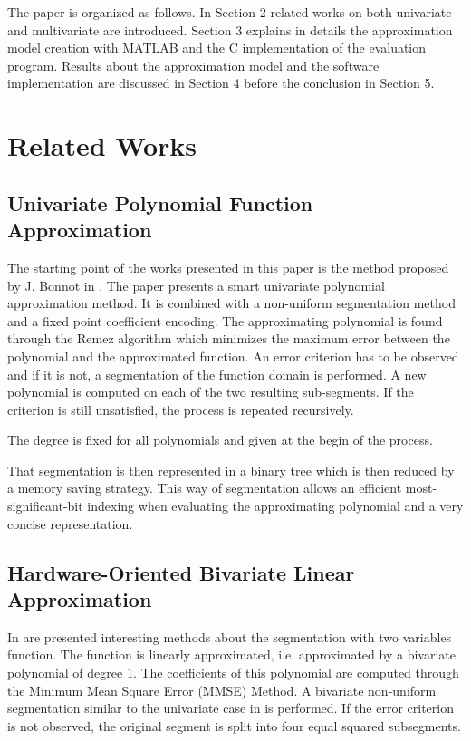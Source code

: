 \documentclass[fleqn,10pt]{SelfArx} %
\begin{document}
The paper is organized as follows. In Section 2 related works on both univariate and multivariate are introduced. Section 3 explains in details the approximation model creation with MATLAB and the C implementation of the evaluation program. Results about the approximation model and the software implementation are discussed in Section 4 before the conclusion in Section 5.

\section{Related Works}
\subsection{Univariate Polynomial Function Approximation}
The starting point of the works presented in this paper is the method proposed by J. Bonnot in \cite{juju}. The paper presents a smart univariate polynomial approximation method. It is combined with a non-uniform segmentation method and a fixed point coefficient encoding.
The approximating polynomial is found through the Remez algorithm which minimizes the maximum error between the polynomial and the approximated function.
An error criterion has to be observed and if it is not, a segmentation of the function domain is performed. A new polynomial is computed on each of the two resulting sub-segments. If the criterion is still unsatisfied, the process is repeated recursively.

The degree is fixed for all polynomials and given at the begin of the process.

That segmentation is then represented in a binary tree which is then reduced by a memory saving strategy.
This way of segmentation allows an efficient most-significant-bit indexing when evaluating the approximating polynomial and a very concise representation.

\subsection{Hardware-Oriented Bivariate Linear Approximation}
In \cite{encodedgradients} are presented interesting methods about the segmentation with two variables function. The function is linearly approximated, i.e. approximated by a bivariate polynomial of degree 1. The coefficients of this polynomial are computed through the Minimum Mean Square Error (MMSE) Method.
A bivariate non-uniform segmentation similar to the univariate case in \cite{juju} is performed. If the error criterion is not observed, the original segment is split into four equal squared subsegments. 
\end{document}
